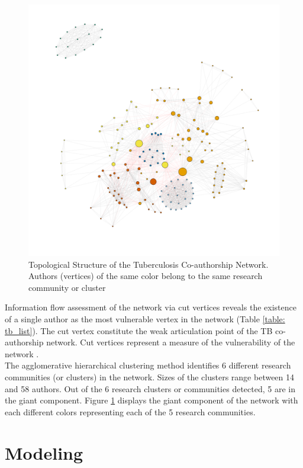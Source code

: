 \begin{figure}[h!]
\centering
\hspace{1.5cm}
\includegraphics[scale=0.35]{Chapters/tb/tbnet}
\caption{Topological Structure of the Tuberculosis Co-authorship Network. Authors (vertices) of the same color belong to the same research community or cluster}
\label{tb_fig5}
\end{figure}

Information flow assessment of the network via cut vertices reveals the existence of a single author as the most vulnerable vertex in the network (Table \ref{table: tb_list}). The cut vertex constitute the weak articulation point of the TB co-authorship network. Cut vertices represent a measure of the vulnerability of the network \cite{kolaczyk_statistical_2014}.\\
The agglomerative hierarchical clustering method identifies 6 different research communities (or clusters) in the network. Sizes of the clusters range between 14 and 58 authors. Out of the 6 research clusters or communities detected, 5 are in the giant component. Figure \ref{tb_fig5} displays the giant component of the network with each different colors representing each of the 5 research communities. \\

\section{Modeling}
